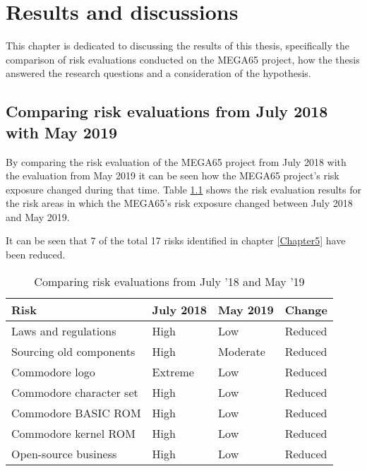 
\chapter{Results and discussions} 
\label{Chapter7}
This chapter is dedicated to discussing the results of this thesis, specifically the comparison of risk evaluations conducted on the MEGA65 project, how the thesis answered the research questions and a consideration of the hypothesis. 

\section{Comparing risk evaluations from July 2018 with May 2019}
\label{comparing risk evaluations}
By comparing the risk evaluation of the MEGA65 project from July 2018 with the evaluation from May 2019 it can be seen how the MEGA65 project's risk exposure changed during that time. Table \ref{tab:table1} shows the risk evaluation results for the risk areas in which the MEGA65's risk exposure changed between July 2018 and May 2019.

It can be seen that 7 of the total 17 risks identified in chapter \ref{Chapter5} have been reduced.

\begin{table}[h!]
  \begin{center}
    \caption{Comparing risk evaluations from July '18 and May '19}
    \label{tab:table1}
    \begin{tabular}{l|l|l|l} %
    	\textbf{Risk} 	&	\textbf{July 2018} & \textbf{May 2019} & \textbf{Change}\\
      \hline
     Laws and regulations 				& High		& Low 		& Reduced \\
     Sourcing old components			& High		& Moderate	& Reduced \\
     Commodore logo						& Extreme	& Low  		& Reduced \\
     Commodore character set			& High		& Low  		& Reduced \\
     Commodore BASIC ROM				& High		& Low 		& Reduced \\
     Commodore kernel ROM				& High		& Low  		& Reduced \\
     Open-source business				& High		& Low  		& Reduced \\
    \end{tabular}
  \end{center}
\end{table}


